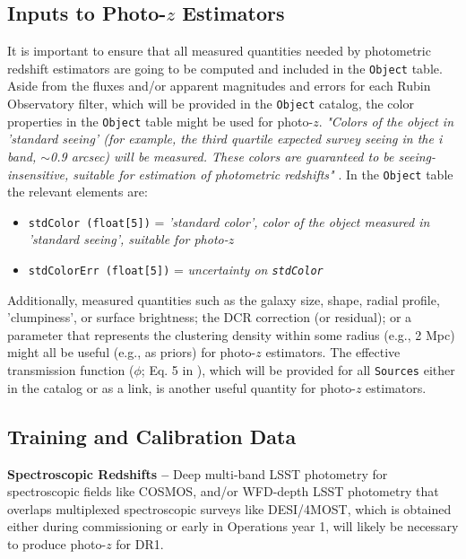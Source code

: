 \documentclass[DM,lsstdraft,toc]{lsstdoc}
\begin{document}
\subsection{Inputs to Photo-$z$ Estimators}\label{ssec:dp_objvals}

It is important to ensure that all measured quantities needed by photometric redshift estimators are going to be computed and included in the {\tt Object} table. 
Aside from the fluxes and/or apparent magnitudes and errors for each Rubin Observatory filter, which will be provided in the {\tt Object} catalog, the color properties in the {\tt Object} table might be used for photo-$z$. {\it "Colors of the object in 'standard seeing' (for example, the third quartile expected survey seeing in the i band, $\sim$0.9 arcsec) will be measured. These colors are guaranteed to be seeing-insensitive, suitable for estimation of photometric redshifts"} . In the {\tt Object} table the relevant elements are:
\vspace{-15pt}
\begin{itemize}
\item \texttt{stdColor (float[5])} = {\it 'standard color', color of the object measured in 'standard seeing', suitable for photo-$z$}
\item \texttt{stdColorErr (float[5])} = {\it uncertainty on \texttt{stdColor}}
\end{itemize}

Additionally, measured quantities such as the galaxy size, shape, radial profile, 'clumpiness', or surface brightness; the DCR correction (or residual); or a parameter that represents the clustering density within some radius (e.g., 2 Mpc) might all be useful (e.g., as priors) for photo-$z$ estimators. The effective transmission function ($\phi$; Eq. 5 in ), which will be provided for all {\tt Sources} either in the catalog or as a link, is another useful quantity for photo-$z$ estimators.


\subsection{Training and Calibration Data}\label{ssec:dp_calib}

{\bf Spectroscopic Redshifts --}
Deep multi-band LSST photometry for spectroscopic fields like COSMOS, and/or WFD-depth LSST photometry that overlaps multiplexed spectroscopic surveys like DESI/4MOST, which is obtained either during commissioning or early in Operations year 1, will likely be necessary to produce photo-$z$ for DR1.
\end{document}
